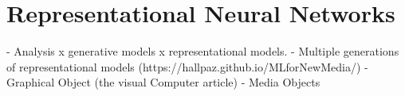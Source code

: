 \section{Representational Neural Networks}

- Analysis x generative models x representational models. 
    - Multiple generations of representational models (https://hallpaz.github.io/MLforNewMedia/)
- Graphical Object (the visual Computer article)
- Media Objects